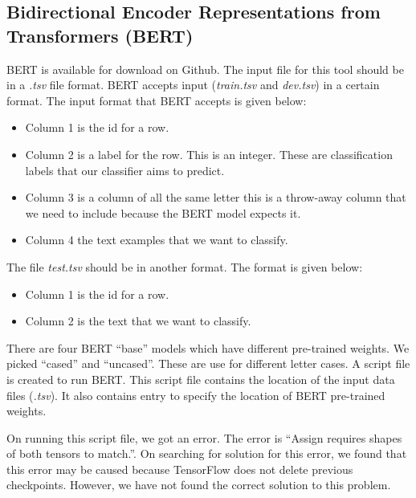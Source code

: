 \subsection{Bidirectional Encoder Representations from Transformers (BERT)}
BERT is available for download on Github. The input file for this tool should be in a \textit{.tsv} file format. BERT accepts input (\textit{train.tsv} and \textit{dev.tsv}) in a certain format.  The input format that BERT accepts is given below:
\begin{itemize}
\item Column 1 is the id for a row.
\item Column 2 is a label for the row. This is an integer. These are classification labels that our classifier aims to predict.
\item Column 3 is a column of all the same letter {\textemdash}  this is a throw-away column that we need to include because the BERT model expects it.
\item Column 4 the text examples that we want to classify.
\end{itemize}
The file \textit{test.tsv} should be in another format. The format is given below:
\begin{itemize}
\item Column 1 is the id for a row.
\item Column 2 is the text that we want to classify.
\end{itemize}
There are four BERT ``base'' models which have different pre-trained weights. We picked ``cased'' and ``uncased''. These are use for different letter cases.
A script file is created to run BERT.  This script file contains the location of the input data files (\textit{.tsv}). It also contains entry to specify the location of BERT pre-trained weights.

On running this script file, we got an error. The error  is ``Assign requires shapes of both tensors to match.''. On searching for solution for this error, we found that this error may be caused because TensorFlow does not delete previous checkpoints. However, we have not found the correct solution to this problem.